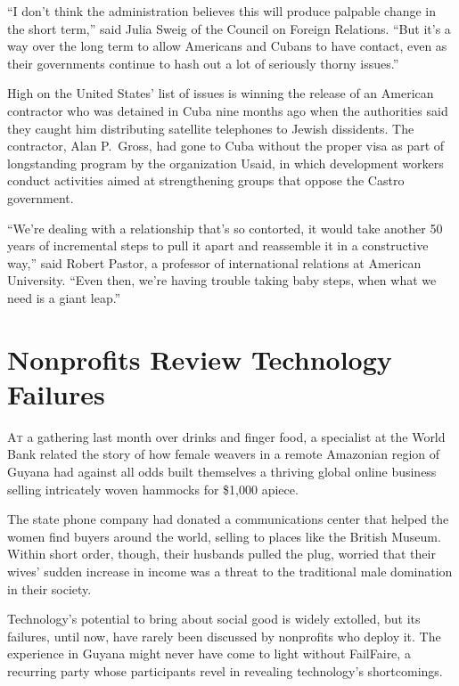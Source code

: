 ﻿\documentclass[12pt]{article}
\begin{document}
``I don't think the administration believes this will produce palpable change in the short term,''
said Julia Sweig of the Council on Foreign Relations. ``But it's a way over the long term to allow
Americans and Cubans to have contact, even as their governments continue to hash out a lot of
seriously thorny issues.''

High on the United States' list of issues is winning the release of an American contractor who was
detained in Cuba nine months ago when the authorities said they caught him distributing satellite
telephones to Jewish dissidents. The contractor, Alan P.~Gross, had gone to Cuba without the proper
visa as part of longstanding program by the organization Usaid, in which development workers conduct
activities aimed at strengthening groups that oppose the Castro government.

``We're dealing with a relationship that's so contorted, it would take another 50 years of
incremental steps to pull it apart and reassemble it in a constructive way,'' said Robert Pastor, a
professor of international relations at American University. ``Even then, we're having trouble
taking baby steps, when what we need is a giant leap.''

\section{Nonprofits Review Technology Failures}

\lettrine{A}{t} a gathering last month over drinks and finger food, a
specialist at the World Bank related the story of how female weavers in a remote Amazonian region of
Guyana had against all odds built themselves a thriving global online business selling intricately
woven hammocks for \$1,000 apiece.

The state phone company had donated a communications center that helped the women find buyers around
the world, selling to places like the British Museum. Within short order, though, their husbands
pulled the plug, worried that their wives' sudden increase in income was a threat to the traditional
male domination in their society.

Technology's potential to bring about social good is widely extolled, but its failures, until now,
have rarely been discussed by nonprofits who deploy it. The experience in Guyana might never have
come to light without FailFaire, a recurring party whose participants revel in revealing
technology's shortcomings.
\end{document}
